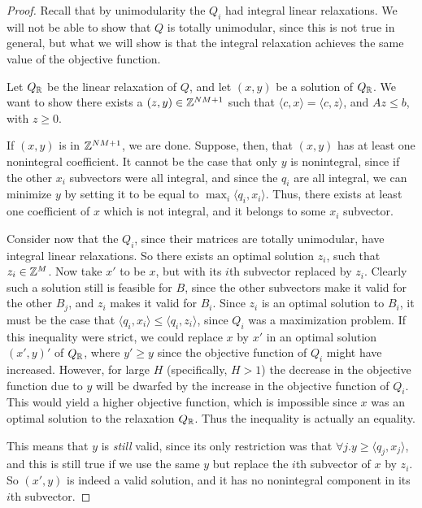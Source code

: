 \begin{proof}
Recall that by unimodularity the $Q_i$ had integral linear relaxations. We will not be able to show that $Q$ is totally unimodular, since this is not true in general, but what we will show is that the integral relaxation achieves the same value of the objective function.

Let $Q_{\mathbb{R}}$ be the linear relaxation of $Q$, and let $(x, y)$ be a solution of $Q_{\mathbb{R}}$. We want to show there exists a $(z, y) \in \mathbb{Z}^{NM+1}$ such that $\langle c, x \rangle = \langle c, z \rangle$, and $Az \le b$, with $z \ge 0$.

If $(x, y)$ is in $\mathbb{Z}^{NM+1}$, we are done. Suppose, then, that $(x, y)$ has at least one nonintegral coefficient. It cannot be the case that only $y$ is nonintegral, since if the other $x_i$ subvectors were all integral, and since the $q_i$ are all integral, we can minimize $y$ by setting it to be equal to $\max_i \langle q_i, x_i \rangle$. Thus, there exists at least one coefficient of $x$ which is not integral, and it belongs to some $x_i$ subvector.

Consider now that the $Q_i$, since their matrices are totally unimodular, have integral linear relaxations. So there exists an optimal solution $z_i$, such that $z_i \in \mathbb{Z}^M$. Now take $x'$ to be $x$, but with its $i$th subvector replaced by $z_i$. Clearly such a solution still is feasible for $B$, since the other subvectors make it valid for the other $B_j$, and $z_i$ makes it valid for $B_i$. Since $z_i$ is an optimal solution to $B_i$, it must be the case that $\langle q_i, x_i \rangle \le \langle q_i, z_i \rangle$, since $Q_i$ was a maximization problem. If this inequality were strict, we could replace $x$ by $x'$ in an optimal solution $(x', y)'$ of $Q_{\mathbb{R}}$, where $y' \ge y$ since the objective function of $Q_i$ might have increased. However, for large $H$ (specifically, $H > 1$) the decrease in the objective function due to $y$ will be dwarfed by the increase in the objective function of $Q_i$. This would yield a higher objective function, which is impossible since $x$ was an optimal solution to the relaxation $Q_{\mathbb{R}}$. Thus the inequality is actually an equality.

This means that $y$ is \emph{still} valid, since its only restriction was that $\forall j. y \ge \langle q_j, x_j \rangle$, and this is still true if we use the same $y$ but replace the $i$th subvector of $x$ by $z_i$. So $(x', y)$ is indeed a valid solution, and it has no nonintegral component in its $i$th subvector.


\end{proof}
